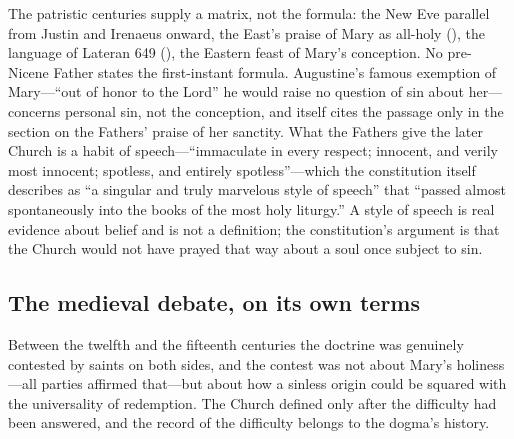 The patristic centuries supply a matrix, not the formula: the New Eve
parallel from Justin and Irenaeus onward, the East's praise of Mary as
all-holy (), the language of Lateran 649
(), the Eastern feast of Mary's conception. No
pre-Nicene Father states the first-instant formula. Augustine's famous
exemption of Mary---``out of honor to the Lord'' he would raise no
question of sin about her---concerns personal sin, not the conception,
and  itself cites the passage only in the section
on the Fathers' praise of her sanctity. What the Fathers give the later Church is a habit of
speech---``immaculate in every respect; innocent, and verily most
innocent; spotless, and entirely spotless''---which the constitution
itself describes as ``a singular and truly marvelous style of speech''
that ``passed almost spontaneously into the books of the most holy
liturgy.'' A style of speech is real evidence about belief and is not a
definition; the constitution's argument is that the Church would not have
prayed that way about a soul once subject to sin.

\subsection*{The medieval debate, on its own terms}

Between the twelfth and the fifteenth centuries the doctrine was
genuinely contested by saints on both sides, and the contest was not
about Mary's holiness---all parties affirmed that---but about how a
sinless origin could be squared with the universality of redemption. The
Church defined only after the difficulty had been answered, and the
record of the difficulty belongs to the dogma's history.

